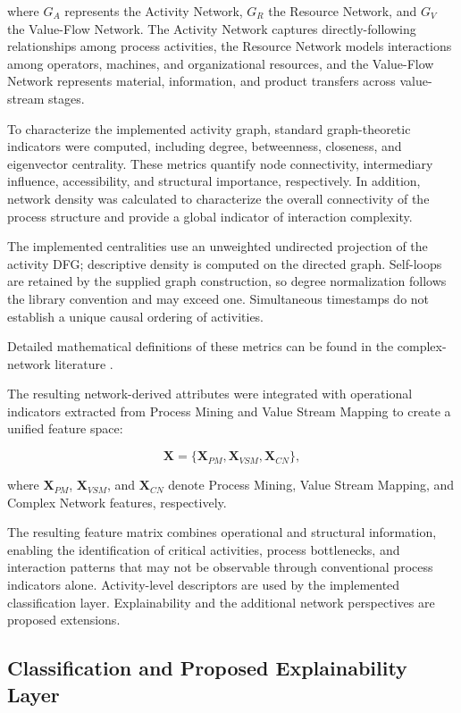 \documentclass[pdflatex,iicol,Numbered,sn-basic]{sn-jnl}
\begin{document}
where \(G_A\) represents the Activity Network, \(G_R\) the Resource Network, and \(G_V\) the Value-Flow Network. The Activity Network captures directly-following relationships among process activities, the Resource Network models interactions among operators, machines, and organizational resources, and the Value-Flow Network represents material, information, and product transfers across value-stream stages.

To characterize the implemented activity graph, standard graph-theoretic indicators were computed, including degree, betweenness, closeness, and eigenvector centrality. These metrics quantify node connectivity, intermediary influence, accessibility, and structural importance, respectively. In addition, network density was calculated to characterize the overall connectivity of the process structure and provide a global indicator of interaction complexity.

The implemented centralities use an unweighted undirected projection of the activity DFG; descriptive density is computed on the directed graph. Self-loops are retained by the supplied graph construction, so degree normalization follows the library convention and may exceed one. Simultaneous timestamps do not establish a unique causal ordering of activities.

Detailed mathematical definitions of these metrics can be found in the complex-network literature \cite{newman2018networks,freeman1978centrality}.

The resulting network-derived attributes were integrated with operational indicators extracted from Process Mining and Value Stream Mapping to create a unified feature space:

\[
\mathbf{X}
=
\{
\mathbf{X}_{PM},
\mathbf{X}_{VSM},
\mathbf{X}_{CN}
\},
\]

where \(\mathbf{X}_{PM}\), \(\mathbf{X}_{VSM}\), and \(\mathbf{X}_{CN}\) denote Process Mining, Value Stream Mapping, and Complex Network features, respectively.

The resulting feature matrix combines operational and structural information, enabling the identification of critical activities, process bottlenecks, and interaction patterns that may not be observable through conventional process indicators alone. Activity-level descriptors are used by the implemented classification layer. Explainability and the additional network perspectives are proposed extensions.

\subsection{Classification and Proposed Explainability Layer}
\label{subsec:xai_ml}
\end{document}
